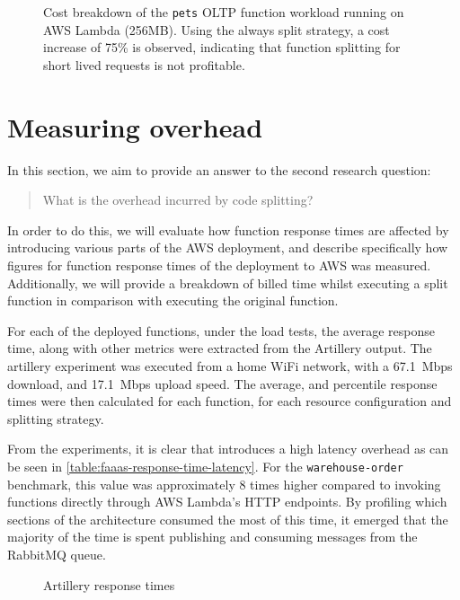 \begin{figure*}
    \begin{center}
        
    \end{center}
    \caption{Cost breakdown of the \texttt{pets} OLTP function workload running on AWS Lambda (256MB). Using the always split strategy, a cost increase of 75\% is observed, indicating that function splitting for short lived requests is not profitable.}
    \label{fig:faaas-mem-prog-strat-heatmap-splitting-saving}
\end{figure*}

\section{Measuring \faaas{} overhead}
In this section, we aim to provide an answer to the second research question: \blockquote{What is the overhead incurred by code splitting?}. In order to do this, we will evaluate how function response times are affected by introducing various parts of the \faaas{} AWS deployment, and describe specifically how figures for function response times of the \faaas{} deployment to AWS was measured. Additionally, we will provide a breakdown of billed time whilst executing a \faaas{} split function in comparison with executing the original function.

For each of the deployed functions, under the load tests, the average response time, along with other metrics were extracted from the Artillery output. The artillery experiment was executed from a home WiFi network, with a \SI{67.1}{Mbps} download, and \SI{17.1}{Mbps} upload speed. The average, and percentile response times were then calculated for each function, for each resource configuration and splitting strategy.

From the experiments, it is clear that \faaas{} introduces a high latency overhead as can be seen in \ref{table:faaas-response-time-latency}. For the \verb|warehouse-order| benchmark, this value was approximately 8 times higher compared to invoking functions directly through AWS Lambda's HTTP endpoints. By profiling which sections of the architecture consumed the most of this time, it emerged that the majority of the time is spent publishing and consuming messages from the RabbitMQ queue.

\begin{figure}
    \begin{center}
        
    \end{center}
    \caption{Artillery response times}
\end{figure}

